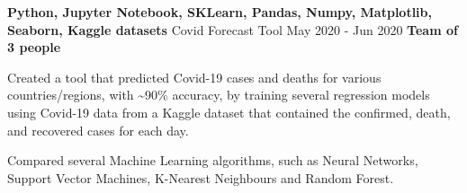   \cventry
    {\textbf{Python, Jupyter Notebook, SKLearn, Pandas, Numpy, Matplotlib, Seaborn, Kaggle datasets}} %
    {Covid Forecast Tool \href{https://github.com/EduRibeiro00/CovidForecast-feup-iart}{\faExternalLink}} %
    {May 2020 - Jun 2020} %
    {\textbf{Team of 3 people}} %
    {
      \begin{cvitems} %
        \item {Created a tool that predicted Covid-19 cases and deaths for various countries/regions, with \~{}90\% accuracy, by training several regression models using Covid-19 data from a Kaggle dataset that contained the confirmed, death, and recovered cases for each day.}
        \item {Compared several Machine Learning algorithms, such as Neural Networks, Support Vector Machines, K-Nearest Neighbours and Random Forest.}
      \end{cvitems}
    }